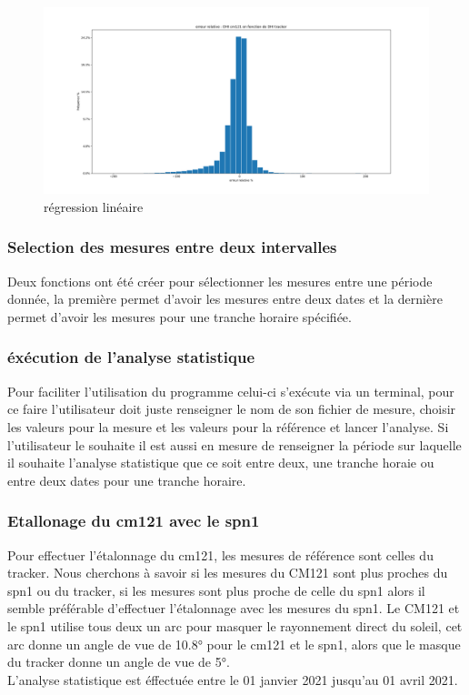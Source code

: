 \documentclass[12pt,a4paper]{article}
\begin{document}
\begin{flushleft}
\begin{figure}[H]
\centering
\includegraphics[width=15cm]{image/histogramme/2.png}  
\caption{régression linéaire}  
\end{figure}

\subsubsection{Selection des mesures entre deux intervalles}

Deux fonctions ont été créer pour sélectionner les mesures entre une période donnée, la première permet d'avoir les mesures entre deux dates et la dernière permet d'avoir les mesures pour une tranche horaire spécifiée.

\subsubsection{éxécution de l'analyse statistique}

Pour faciliter l'utilisation du programme celui-ci s'exécute via un terminal, pour ce faire l'utilisateur doit juste renseigner le nom de son fichier de mesure, choisir les valeurs pour la mesure et les valeurs pour la référence et lancer l'analyse. Si l'utilisateur le souhaite il est aussi en mesure de renseigner la période sur laquelle il souhaite l'analyse statistique que ce soit entre deux, une tranche horaie ou entre deux dates pour une tranche horaire.


\subsubsection{Etallonage du cm121 avec le spn1}

Pour effectuer l'étalonnage du cm121, les mesures de référence sont celles du tracker. Nous cherchons à savoir si les mesures du CM121 sont plus proches du spn1 ou du tracker, si les mesures sont plus proche de celle du spn1 alors il semble préférable d'effectuer l'étalonnage avec les mesures du spn1. Le CM121 et le spn1 utilise tous deux un arc pour masquer le rayonnement direct du soleil, cet arc donne un angle de vue de 10.8° pour le cm121 et le spn1, alors que le masque du tracker donne un angle de vue de 5°.\\
L'analyse statistique est éffectuée entre le 01 janvier 2021 jusqu'au 01 avril 2021.


\end{flushleft}
\end{document}
